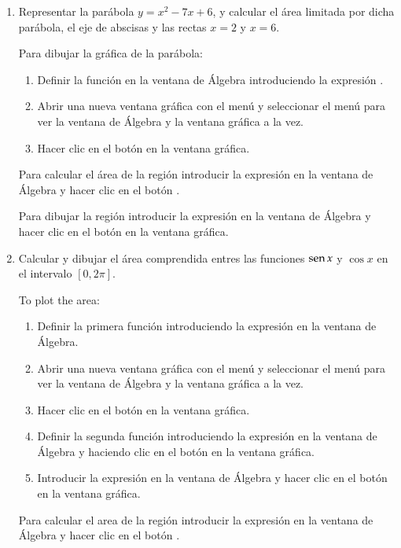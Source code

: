 \begin{enumerate}[leftmargin=*]
\item Representar la parábola $y=x^{2}-7x+6$, y calcular el área limitada por dicha parábola, el eje de abscisas y las rectas $x=2$ y $x=6$.
\begin{indicacion}
Para dibujar la gráfica de la parábola:
\begin{enumerate}
\item Definir la función en la ventana de Álgebra introduciendo la expresión .
\item Abrir una nueva ventana gráfica con el menú  y seleccionar el menú  para ver la ventana de Álgebra y la ventana gráfica a la vez.
\item Hacer clic en el botón  en la ventana gráfica.
\end{enumerate}
Para calcular el área de la región introducir la expresión  en la ventana de Álgebra y hacer clic en el botón .

Para dibujar la región introducir la expresión  en la ventana de Álgebra y hacer clic en el botón  en la ventana gráfica.
\end{indicacion}

\item Calcular y dibujar el área comprendida entres las funciones $\operatorname{sen} x$ y $\cos x$ en el intervalo $[0,2\pi]$.
\begin{indicacion}
To plot the area:
\begin{enumerate}
\item Definir la primera función introduciendo la expresión  en la ventana de Álgebra.
\item Abrir una nueva ventana gráfica con el menú  y seleccionar el menú  para ver la ventana de Álgebra y la ventana gráfica a la vez.
\item Hacer clic en el botón  en la ventana gráfica.
\item Definir la segunda función introduciendo la expresión  en la ventana de Álgebra y haciendo clic en el botón  en la ventana gráfica.
\item Introducir la expresión  en la ventana de Álgebra y hacer clic en el botón  en la ventana gráfica.
\end{enumerate}
Para calcular el area de la región introducir la expresión  en la ventana de Álgebra y hacer clic en el botón .
\end{indicacion}



\end{enumerate}
